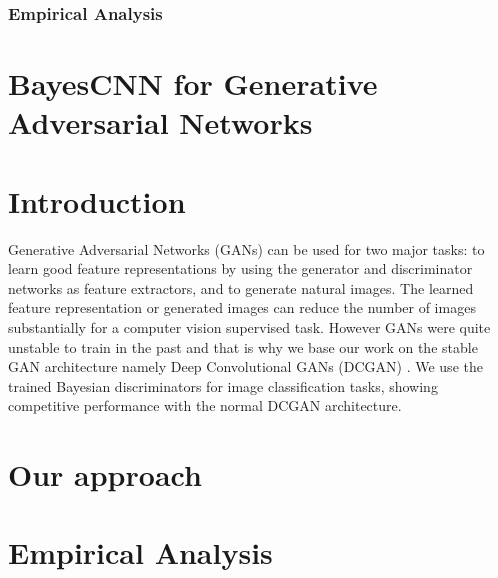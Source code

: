 \subsubsection{Empirical Analysis}



\section{BayesCNN for Generative Adversarial Networks}

\section{Introduction}
Generative Adversarial Networks (GANs) \cite{goodfellow2014generative} can be used for two major tasks: to learn good feature representations by using the generator and discriminator networks as feature extractors, and to generate natural images. The learned feature representation or generated images can reduce the number of images substantially for a computer vision supervised task. However GANs were quite unstable to train in the past and that is why we base our work on the stable GAN architecture namely Deep Convolutional GANs (DCGAN) \cite{DBLP:journals/corr/RadfordMC15}. We use the trained Bayesian discriminators for image classification tasks, showing competitive performance with the normal DCGAN architecture.

\section{Our approach}
\section{Empirical Analysis}




    
